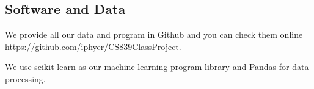 \documentclass{article}
\begin{document}
\subsection*{Software and Data}

We provide all our data and program in Github and you can check them online \url{https://github.com/iphyer/CS839ClassProject}.

We use scikit-learn \cite{scikit-learn} as our machine learning program library and Pandas \cite{mckinney2015pandas} for data processing.




\end{document}
